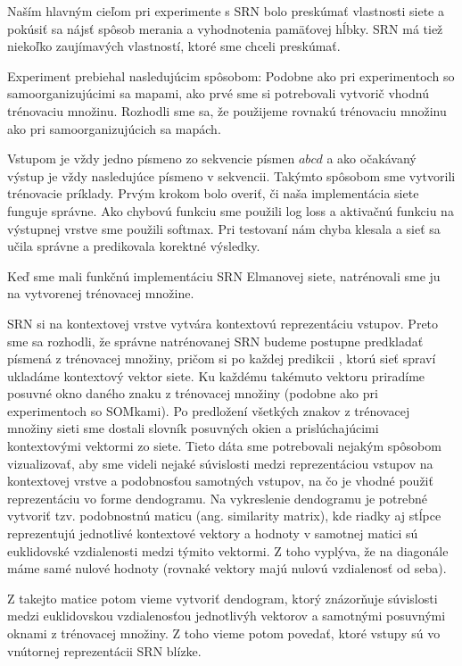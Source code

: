 Naším hlavným cieľom pri experimente s SRN bolo preskúmať vlastnosti siete a pokúsiť sa nájsť 
spôsob merania a vyhodnotenia pamäťovej hĺbky.
SRN má tiež niekoľko zaujímavých vlastností, ktoré sme chceli preskúmať.

Experiment prebiehal nasledujúcim spôsobom:
Podobne ako pri experimentoch so samoorganizujúcimi sa mapami, ako prvé sme si potrebovali vytvorič vhodnú trénovaciu množinu.
Rozhodli sme sa, že použijeme rovnakú trénovaciu množinu ako pri samoorganizujúcich sa mapách.

Vstupom je vždy jedno písmeno zo sekvencie písmen $abcd$ a ako očakávaný výstup je vždy nasledujúce písmeno v sekvencii.
Takýmto spôsobom sme vytvorili trénovacie príklady.
Prvým krokom bolo overiť, či naša implementácia siete funguje správne. 
Ako chybovú funkciu sme použili log loss a aktivačnú funkciu na výstupnej vrstve sme použili softmax. 
Pri testovaní nám chyba klesala a sieť sa učila správne a predikovala korektné výsledky.

Keď sme mali funkčnú implementáciu SRN Elmanovej siete, natrénovali sme ju na vytvorenej trénovacej množine.

SRN si na kontextovej vrstve vytvára kontextovú reprezentáciu vstupov. Preto sme sa rozhodli, že 
správne natrénovanej SRN budeme postupne predkladať písmená z trénovacej množiny, pričom si po každej predikcii
, ktorú sieť spraví ukladáme kontextový vektor siete. 
Ku každému takémuto vektoru priradíme posuvné okno daného znaku z trénovacej množiny (podobne ako pri experimentoch so SOMkami).
Po predložení všetkých znakov z trénovacej množiny sieti sme dostali slovník posuvných okien a prislúchajúcimi kontextovými vektormi
zo siete.
Tieto dáta sme potrebovali nejakým spôsobom vizualizovať, aby sme videli nejaké súvislosti medzi reprezentáciou vstupov na kontextovej vrstve a 
podobnosťou samotných vstupov, na čo je vhodné použiť reprezentáciu vo forme dendogramu.
Na vykreslenie dendogramu je potrebné vytvoriť tzv. podobnostnú maticu (ang. similarity matrix), kde 
riadky aj stĺpce reprezentujú jednotlivé kontextové vektory a hodnoty v samotnej matici sú euklidovské vzdialenosti medzi týmito vektormi.
Z toho vyplýva, že na diagonále máme samé nulové hodnoty (rovnaké vektory majú nulovú vzdialenosť od seba).


Z takejto matice potom vieme vytvoriť dendogram, ktorý znázorňuje súvislosti medzi euklidovskou vzdialenosťou jednotlivýh vektorov a samotnými posuvnými oknami z trénovacej množiny.
Z toho vieme potom povedať, ktoré vstupy sú vo vnútornej reprezentácii SRN blízke. 




